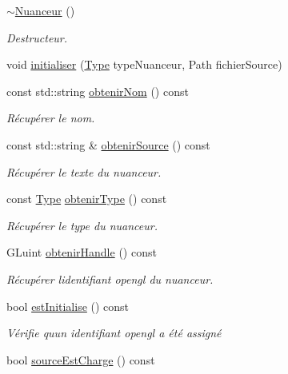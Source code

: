 \begin{DoxyCompactItemize}
\item 
\hyperlink{classopengl_1_1_nuanceur_a9e4703c2ea30007c34f21ea3e1264b1d}{$\sim$\+Nuanceur} ()
\begin{DoxyCompactList}\small\item\em Destructeur. \end{DoxyCompactList}\item 
void \hyperlink{classopengl_1_1_nuanceur_a5bb31fc7295863b91fd0ca724050a2f0}{initialiser} (\hyperlink{classopengl_1_1_nuanceur_ad2783f2cbd6fb7a5f6dc5032f998c65e}{Type} type\+Nuanceur, Path fichier\+Source)
\item 
const std\+::string \hyperlink{classopengl_1_1_nuanceur_afebe5099228e3ee004843fc97efe5884}{obtenir\+Nom} () const 
\begin{DoxyCompactList}\small\item\em Récupérer le nom. \end{DoxyCompactList}\item 
const std\+::string \& \hyperlink{classopengl_1_1_nuanceur_ab313cd056e0642b750e820df02874ab1}{obtenir\+Source} () const 
\begin{DoxyCompactList}\small\item\em Récupérer le texte du nuanceur. \end{DoxyCompactList}\item 
const \hyperlink{classopengl_1_1_nuanceur_ad2783f2cbd6fb7a5f6dc5032f998c65e}{Type} \hyperlink{classopengl_1_1_nuanceur_a894470a6ffd5a7762059680eef630548}{obtenir\+Type} () const 
\begin{DoxyCompactList}\small\item\em Récupérer le type du nuanceur. \end{DoxyCompactList}\item 
G\+Luint \hyperlink{classopengl_1_1_nuanceur_af7e326c1f8c91f629b7327e005b84fdb}{obtenir\+Handle} () const 
\begin{DoxyCompactList}\small\item\em Récupérer l\textquotesingle{}identifiant opengl du nuanceur. \end{DoxyCompactList}\item 
bool \hyperlink{classopengl_1_1_nuanceur_af6e827e93ce8398456f6781db5c84387}{est\+Initialise} () const 
\begin{DoxyCompactList}\small\item\em Vérifie qu\textquotesingle{}un identifiant opengl a été assigné \end{DoxyCompactList}\item 
bool \hyperlink{classopengl_1_1_nuanceur_a9373697b24d60d32bae78e183ccb7a4f}{source\+Est\+Charge} () const 

\end{DoxyCompactItemize}

